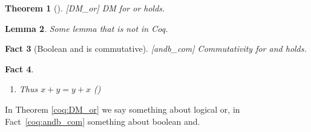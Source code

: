 \documentclass{article}
\theoremstyle{coqtheorem}
\newtheorem{theorem}{Theorem}
\newtheorem{lemma}[theorem]{Lemma}
\newtheorem{fact}[theorem]{Fact}
\begin{document}
\begin{theorem}[][DM_or]
  DM for or holds.
\end{theorem}

\begin{lemma}
  Some lemma that is not in Coq.
\end{lemma}

\begin{fact}[Boolean and is commutative][andb_com]
  Commutativity for and holds.
\end{fact}

\begin{fact}~
  \begin{enumerate}
  \coqitem[plus_O] $x + 0 = x$
  \coqitem[plus_S] $x + S y = S (x + y)$
  \item Thus $x + y = y + x$ ()
\end{enumerate}
\end{fact}

In Theorem \ref{coq:DM_or} we say something about logical or, in
Fact~\ref{coq:andb_com} something about boolean and.
\end{document}
